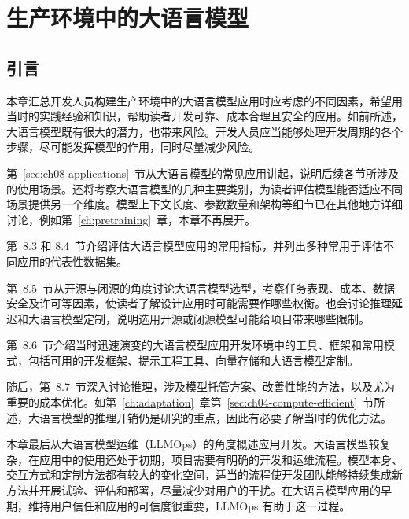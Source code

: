 \chapter{生产环境中的大语言模型}
\label{ch:production}

\section{引言}
本章汇总开发人员构建生产环境中的大语言模型应用时应考虑的不同因素，希望用当时的实践经验和知识，帮助读者开发可靠、成本合理且安全的应用。如前所述，大语言模型既有很大的潜力，也带来风险。开发人员应当能够处理开发周期的各个步骤，尽可能发挥模型的作用，同时尽量减少风险。

第~\ref{sec:ch08-applications}~节从大语言模型的常见应用讲起，说明后续各节所涉及的使用场景。还将考察大语言模型的几种主要类别，为读者评估模型能否适应不同场景提供另一个维度。模型上下文长度、参数数量和架构等细节已在其他地方详细讨论，例如第~\ref{ch:pretraining}~章，本章不再展开。

第~8.3 和 8.4~节介绍评估大语言模型应用的常用指标，并列出多种常用于评估不同应用的代表性数据集。

第~8.5~节从开源与闭源的角度讨论大语言模型选型，考察任务表现、成本、数据安全及许可等因素，使读者了解设计应用时可能需要作哪些权衡。也会讨论推理延迟和大语言模型定制，说明选用开源或闭源模型可能给项目带来哪些限制。

第~8.6~节介绍当时迅速演变的大语言模型应用开发环境中的工具、框架和常用模式，包括可用的开发框架、提示工程工具、向量存储和大语言模型定制。

随后，第~8.7~节深入讨论推理，涉及模型托管方案、改善性能的方法，以及尤为重要的成本优化。如第~\ref{ch:adaptation}~章第~\ref{sec:ch04-compute-efficient}~节所述，大语言模型的推理开销仍是研究的重点，因此有必要了解当时的优化方法。

本章最后从大语言模型运维（LLMOps）的角度概述应用开发。大语言模型较复杂，在应用中的使用还处于初期，项目需要有明确的开发和运维流程。模型本身、交互方式和定制方法都有较大的变化空间，适当的流程使开发团队能够持续集成新方法并开展试验、评估和部署，尽量减少对用户的干扰。在大语言模型应用的早期，维持用户信任和应用的可信度很重要，LLMOps 有助于这一过程。










